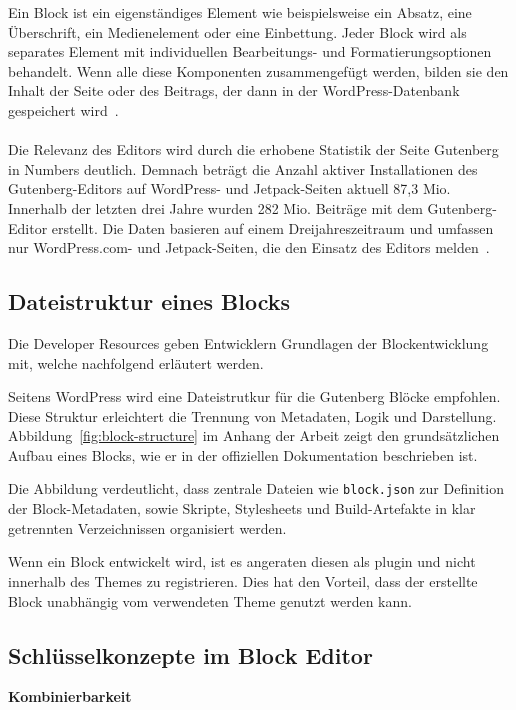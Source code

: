 Ein Block ist ein eigenständiges Element wie beispielsweise ein Absatz, eine Überschrift, ein Medienelement oder eine Einbettung.
Jeder Block wird als separates Element mit individuellen Bearbeitungs- und Formatierungsoptionen behandelt.
Wenn alle diese Komponenten zusammengefügt werden, bilden sie den Inhalt der Seite oder des Beitrags, der dann in der WordPress-Datenbank gespeichert wird~\cite{wordpress2024plugin_blockeditor}.
\\
\\
Die Relevanz des Editors wird durch die erhobene Statistik der Seite Gutenberg in Numbers deutlich.
Demnach beträgt die Anzahl aktiver Installationen des Gutenberg-Editors auf WordPress- und Jetpack-Seiten aktuell 87,3 Mio.
Innerhalb der letzten drei Jahre wurden 282 Mio. Beiträge mit dem Gutenberg-Editor erstellt.
Die Daten basieren auf einem Dreijahreszeitraum und umfassen nur WordPress.com- und Jetpack-Seiten, die den Einsatz des Editors melden~\cite{gutenstats}.

\subsection{Dateistruktur eines Blocks}
Die Developer Resources geben Entwicklern Grundlagen der Blockentwicklung mit, welche nachfolgend erläutert werden.

Seitens WordPress wird eine Dateistrutkur für die Gutenberg Blöcke empfohlen.
Diese Struktur erleichtert die Trennung von Metadaten, Logik und Darstellung.
Abbildung~\ref{fig:block-structure} im Anhang der Arbeit zeigt den grundsätzlichen Aufbau eines Blocks, wie er in der offiziellen Dokumentation beschrieben ist.

Die Abbildung verdeutlicht, dass zentrale Dateien wie \texttt{block.json} zur Definition der Block-Metadaten,
sowie Skripte, Stylesheets und Build-Artefakte in klar getrennten Verzeichnissen organisiert werden.



Wenn ein Block entwickelt wird, ist es angeraten diesen als \gls{plugin} und nicht innerhalb des Themes zu registrieren.
Dies hat den Vorteil, dass der erstellte Block unabhängig vom verwendeten Theme genutzt werden kann.
\subsection{Schlüsselkonzepte im Block Editor}
\textbf{Kombinierbarkeit}


